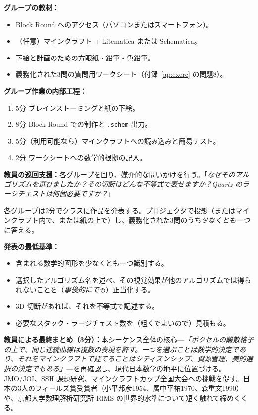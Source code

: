 \documentclass[12pt,a4paper]{scrartcl}
\newcommand{\tempo}[1]{\textnormal{\footnotesize\color{bg!90!white}\textsf{#1}}}
\begin{document}
\begin{katsudou}[5.3 --- 制作 \quad\tempo{20分}]\label{at:53}
\textbf{グループの教材：}
\begin{itemize}[leftmargin=1.3em,itemsep=0.15em,topsep=0.3em,nosep]
  \item Block Round へのアクセス（パソコンまたはスマートフォン）。
  \item（任意）マインクラフト + Litematica または Schematica。
  \item 下絵と計画のための方眼紙・鉛筆・色鉛筆。
  \item 義務化された3問の質問用ワークシート（付録~\ref{ap:exerc} の問題8）。
\end{itemize}

\textbf{グループ作業の内部工程：}
\begin{enumerate}[leftmargin=1.5em,itemsep=0.15em,topsep=0.3em,nosep]
  \item \tempo{5分} ブレインストーミングと紙の下絵。
  \item \tempo{8分} Block Round での制作と \texttt{.schem} 出力。
  \item \tempo{5分}（利用可能なら）マインクラフトへの読み込みと簡易テスト。
  \item \tempo{2分} ワークシートへの数学的根拠の記入。
\end{enumerate}

\textbf{教員の巡回支援：}各グループを回り、媒介的な問いかけを行う。「\emph{なぜそのアルゴリズムを選びましたか？その切断はどんな不等式で表せますか？Quartz のラージチェストは何個必要ですか？}」
\end{katsudou}

\begin{katsudou}[5.4 --- 発表と全体まとめ \quad\tempo{10分}]\label{at:54}
各グループは2分でクラスに作品を発表する。プロジェクタで投影（またはマインクラフト内で、または紙の上で）し、義務化された3問のうち\emph{少なくとも一つ}に答える。

\textbf{発表の最低基準：}
\begin{itemize}[leftmargin=1.3em,itemsep=0.1em,topsep=0.2em,nosep]
  \item 含まれる数学的図形を少なくとも一つ識別する。
  \item 選択したアルゴリズム名を述べ、その視覚効果が他のアルゴリズムでは得られないことを（\emph{事後的にでも}）正当化する。
  \item 3D 切断があれば、それを不等式で記述する。
  \item 必要なスタック・ラージチェスト数を（粗くでよいので）見積もる。
\end{itemize}

\textbf{教員による最終まとめ（3分）：}本シーケンス全体の核心---\emph{「ボクセルの離散格子の上で、同じ連続曲線は複数の表現を許す。一つを選ぶことは数学的決定であり、それをマインクラフトで建てることはシティズンシップ、資源管理、美的選択の決定でもある」}---を再確認し、現代日本数学の地平に位置づける。\hyperref[sec:jmo]{JMO/JOI}、SSH 課題研究、マインクラフトカップ全国大会への挑戦を促す。日本の3人のフィールズ賞受賞者（小平邦彦1954、廣中平祐1970、森重文1990）や、京都大学数理解析研究所 RIMS の世界的水準について短く触れて締めくくる。
\end{katsudou}
\end{document}
